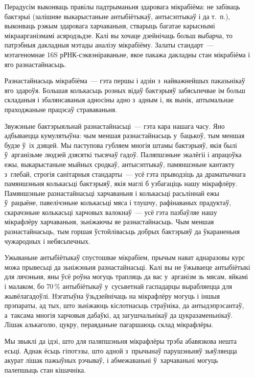 Перадусім выконваць правілы падтрыманьня здаровага мікрабіёма: не забіваць бактэрыі (залішняе выкарыстаньне антыбіётыкаў, антысэптыкаў і да т.~п.), выконваць рэжым здаровага харчаваньня, стварыць багатае карыснымі мікраарганізмамі асяродзьдзе. Калі вы хочаце дзейнічаць больш выбарча, то патрэбныя дакладныя мэтады аналізу мікрабіёму. Залаты стандарт~--- мэтагеномнае 16S рРНК-сэквэніраваньне, якое пакажа дакладны стан мікрабіёма і яго разнастайнасьць.

Разнастайнасьць мікрабіёма~--- гэта першы і адзін з~найважнейшых паказьнікаў яго здароўя. Большая колькасьць розных відаў бактэрыяў забясьпечвае ім больш складаныя і збалянсаваныя адносіны адно з~адным і, як вынік, аптымальнае праходжаньне працэсаў страваваньня.

Звужэньне бактэрыяльнай разнастайнасьці~--- гэта кара нашага часу. Яно адбываецца кумулятыўна: чым меншая разнастайнасьць у~бацькоў, тым меншая будзе ў~іх дзяцей. Мы паступова губляем многія штамы бактэрыяў, якія былі ў~арганізьме людзей дзясяткі тысячаў гадоў. Паляпшэньне экалёгіі і апрацоўка ежы, выкарыстаньне мыйных сродкаў, антысэптыкаў, памяншэньне кантакту з~глебай, строгія санітарныя стандарты~--- усё гэта прыводзіць да драматычнага памяншэньня колькасьці бактэрыяў, якія маглі б узбагаціць нашу мікрафлёру. Памяншэньне разнастайнасьці харчаваньня і колькасьці расьліннай ежы ў~рацыёне, павелічэньне колькасьці мяса і тлушчу, рафінаваных прадуктаў, скарачэньне колькасьці харчовых валокнаў~--- усё гэта пазбаўляе нашу мікрафлёру харчаваньня, зьніжаючы яе разнастайнасьць. Чым меншая разнастайнасьць, тым горшая ўстойлівасьць добрых бактэрыяў да ўкараненьня чужародных і небясьпечных.

Ужываньне антыбіётыкаў спустошвае мікрабіем, прычым нават аднаразовы курс можа прывесьці да зьніжэньня разнастайнасьці. Калі вы не ўжываеце антыбіётыкі для лячэньня, яны ўсё роўна могуць трапляць да вас у~арганізм зь мясам, яйкамі і малаком, бо 70\,\% антыбіётыкаў у~сусьветнай гаспадарцы вырабляецца для жывёлагадоўлі. Нэгатыўна ўзьдзейнічаць на мікрафлёру могуць і іншыя прэпараты, ад тых, што зьніжаюць кіслотнасьць страўніка, да антыдэпрэсантаў, а~таксама многія харчовыя дабаўкі, ад загушчальнікаў да цукразаменьнікаў. Лішак алькаголю, цукру, пераяданьне пагаршаюць склад мікрафлёры.

Мы звыклі да ідэі, што для паляпшэньня мікрафлёры трэба абавязкова нешта есьці. Аднак ёсьць гіпотэзы, што адной з~прычынаў парушэньняў зьяўляецца акурат лішак пажыўных рэчываў, і абмежаваньні ў~харчаваньні могуць палепшыць стан кішачніка.

